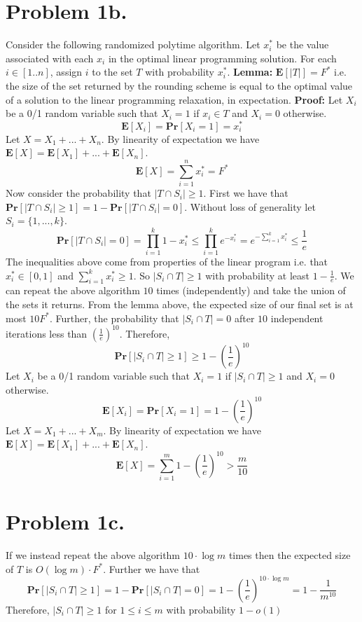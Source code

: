 \documentclass[12pt]{article}
\begin{document}
\section*{Problem 1b.}
Consider the following randomized polytime algorithm. Let $x^*_i$ be the value
associated with each $x_i$ in the optimal linear programming solution. For each
$i \in [1..n]$, assign $i$ to the set $T$ with probability $x^*_i$.
\vspace{2mm}
\newline
\textbf{Lemma:} $\textbf{E}[|T|] = F^*$ i.e. the size of the set returned
by the rounding scheme is equal to the optimal value of a solution to the linear
programming relaxation, in expectation.
\vspace{2mm}
\newline
\textbf{Proof:} Let $X_i$ be a 0/1 random variable such that
$X_i = 1$ if $x_i \in T$ and $X_i = 0$ otherwise.
$$\textbf{E}[X_i] = \textbf{Pr}[X_i = 1] = x^*_i$$
Let $X = X_1 + ... + X_n$. By linearity of expectation we have
$\textbf{E}[X] = \textbf{E}[X_1] + ... + \textbf{E}[X_n]$.
$$\textbf{E}[X] = \sum^n_{i=1} x^*_i = F^*$$
Now consider the probability that $|T\cap S_i|\ge 1$. First we have that
$\textbf{Pr}[|T\cap S_i| \ge 1] = 1 - \textbf{Pr}[|T\cap S_i| = 0]$.
Without loss of generality let $S_i = \{1,...,k\}$.
$$ \textbf{Pr}[|T\cap S_i| = 0] =
\prod_{i=1}^k 1-x^*_i \le \prod_{i=1}^k e^{-x^*_i}
= e^{-\sum^k_{i=1} x^*_i} \le \frac{1}{e}$$
The inequalities above come from properties of the linear program i.e. that
$x^*_i \in [0,1]$ and $\sum^k_{i=1} x^*_i \ge 1$. So $|S_i \cap T| \ge 1$ with
probability at least $1-\frac{1}{e}$.
\vspace{3mm}
\newline
We can repeat the above algorithm $10$ times (independently) and take the union
of the sets it returns. From the lemma above, the expected size of our final set
is at most $10F^*$. Further, the probability that $|S_i \cap T| = 0$ after
$10$ independent iterations less than $\left(\frac{1}{e}\right)^{10}$.
Therefore,
$$\textbf{Pr}[|S_i\cap T| \ge 1] \ge 1 - \left(\frac{1}{e}\right)^{10}$$
Let $X_i$ be a 0/1 random variable such that $X_i = 1$ if $|S_i \cap T| \ge 1$
and $X_i = 0$ otherwise.
$$\textbf{E}[X_i] = \textbf{Pr}[X_i = 1] = 1 - \left(\frac{1}{e}\right)^{10}$$
Let $X = X_1 + ... + X_m$. By linearity of expectation we have
$\textbf{E}[X] = \textbf{E}[X_1] + ... + \textbf{E}[X_n]$.
$$\textbf{E}[X] = \sum^m_{i=1} 1 - \left(\frac{1}{e}\right)^{10} > \frac{m}{10}$$

\section*{Problem 1c.}
If we instead repeat the above algorithm $10 \cdot \log m$ times then the
expected size of $T$ is $O(\log m)\cdot F^*$. Further we have that
$$\textbf{Pr}[|S_i\cap T| \ge 1] = 1 - \textbf{Pr}[|S_i\cap T| = 0]
= 1 - \left(\frac{1}{e}\right)^{10\cdot \log m} = 1 - \frac{1}{m^{10}}$$
Therefore, $|S_i\cap T| \ge 1$ for $1 \le i \le m$ with probability $1-o(1)$ 
\end{document}

